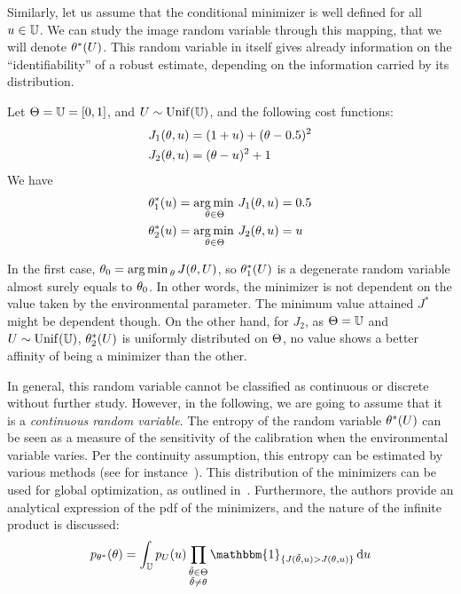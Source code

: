\documentclass[../../Main_ManuscritThese.tex]{subfiles}
\begin{document}
Similarly, let us assume that the conditional minimizer is well defined for all $u\in \mathbb{U}$. We can study the image random variable through this mapping, that we will denote $\theta^*(U)$.
This random variable in itself gives already information on the ``identifiability'' of a robust estimate, depending on the information carried by its distribution.
\begin{example}
Let $\Theta = \mathbb{U}= [0, 1]$, and $U \sim \mathrm{Unif}(\mathbb{U})$, and the following cost functions:
\begin{align}
  J_1(\theta, u) &= (1+u)+(\theta - 0.5)^2\\
  J_2(\theta, u) &= (\theta-u)^2 + 1
\end{align}
We have
\begin{align}
  \theta^*_1(u) &= \operatorname*{arg\,min \,}_{\theta \in \Theta} J_1(\theta, u) = 0.5 \\
  \theta^*_2(u) &= \operatorname*{arg\,min \,}_{\theta\in\Theta} J_2(\theta, u) = u
\end{align}

In the first case, $\theta_0 = \operatorname*{arg\,min \,}_{\theta} J(\theta, U)$, so $\theta_1^*(U)$ is a degenerate random variable almost surely equals to  $\theta_0$. In other words, the minimizer is not dependent on the value taken by the environmental parameter. The minimum value attained $J^*$ might be dependent though. On the other hand, for $J_2$, as $\Theta=\mathbb{U}$ and $U \sim \mathrm{Unif}(\mathbb{U})$, $\theta_2^*(U)$ is uniformly distributed on $\Theta$, no value shows a better affinity of being a minimizer than the other.
\end{example}

In general, this random variable cannot be classified as continuous or discrete without further study. However, in the following, we are going to assume that it is a \emph{continuous random variable}.
The entropy of the random variable $\theta^*(U)$ can be seen as a measure of the sensitivity of the calibration when the environmental variable varies. 
Per the continuity assumption, this entropy can be estimated by various methods (see for instance~\cite{beirlant_nonparametric_1997}).
This distribution of the minimizers can be used for global optimization, as outlined in~\cite{hennig_entropy_2011}. Furthermore, the authors provide an analytical expression of the pdf of the minimizers, and the nature of the infinite product is discussed:
\begin{equation}
  p_{\KK^*}(\kk) = \int_{\Uspace} p_{\UU}(\uu)\prod_{\substack{\tilde{\kk}\in \Kspace\\\tilde{\kk}\neq \kk}} \mathbbm{1}_{\{J(\tilde{\kk},\uu) > J(\kk, \uu)\}}\,\mathrm{d}\uu
\end{equation}
\end{document}
